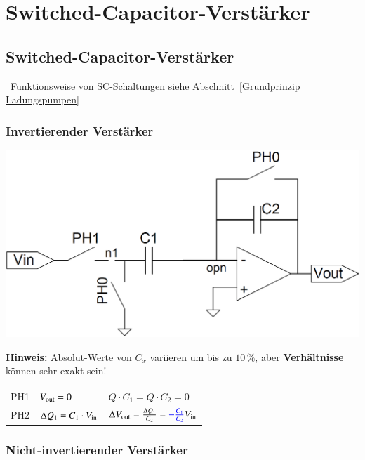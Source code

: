 \section{Switched-Capacitor-Verstärker}

\subsection{Switched-Capacitor-Verstärker}

\textrightarrow\ Funktionsweise von SC-Schaltungen siehe Abschnitt~\ref{Grundprinzip Ladungspumpen}


\subsubsection{Invertierender Verstärker}

\begin{minipage}[c]{0.4\columnwidth}
    \includegraphics[width=\columnwidth]{images/invertierender_sc_verstaerker.png}
\end{minipage}
\hfill
\begin{minipage}[c]{0.58\columnwidth}
    \textbf{Hinweis:} Absolut-Werte von $C_x$ variieren um bis zu $10 \, \% $, aber \textbf{Verhältnisse} können sehr exakt sein! 

    \begin{tabular}{@{}l l l@{}} 
        PH1   & $V_{\rm out} = 0$                   & $Q \cdot C_1 = Q \cdot C_2 = 0$ \\
        PH2   & $\Delta Q_1 = C_1 \cdot V_{\rm in}$ & $\Delta V_{\rm out} = \frac{\Delta Q_1}{C_2} = {\color{blue}- \frac{C_1}{C_2}} V_{\rm in}$ \\
    \end{tabular}
\end{minipage}


\subsubsection{Nicht-invertierender Verstärker}

